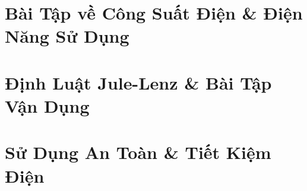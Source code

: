 \documentclass{article}
\begin{document}

\section{Bài Tập về Công Suất Điện \& Điện Năng Sử Dụng}


\section{Định Luật Jule-Lenz \& Bài Tập Vận Dụng}


\section{Sử Dụng An Toàn \& Tiết Kiệm Điện}


\printbibliography[heading=bibintoc]
	
\end{document}

